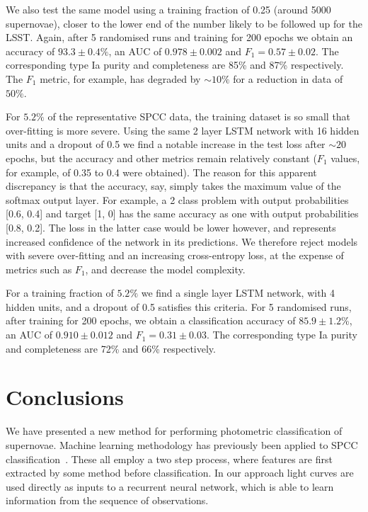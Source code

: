 \documentclass[nofootinbib,amsmath,amssymb,10pt,eqsecnum, twocolumn]{revtex4-1}
\begin{document}
We also test the same model using a training fraction of 0.25 (around 5000 supernovae), closer to the lower  end of the number likely to be followed up for the LSST. Again, after 5 randomised runs and training for 200 epochs we obtain an accuracy of $93.3 \pm 0.4\%$, an AUC of $0.978 \pm 0.002$ and $F_1 = 0.57 \pm 0.02$. The corresponding type Ia purity and completeness are 85\% and 87\% respectively. The $F_1$ metric, for example, has degraded by $\sim10\%$ for a reduction in data of $50\%$.

For $5.2\%$ of the representative SPCC data, the training dataset is so small that over-fitting is more severe. Using the same 2 layer LSTM network with 16 hidden units and a dropout of 0.5 we find a notable increase in the test loss after $\sim 20$ epochs, but the accuracy and other metrics remain relatively constant ($F_1$ values, for example, of 0.35 to 0.4 were obtained). The reason for this apparent discrepancy is that the accuracy, say, simply takes the maximum value of the softmax output layer. For example, a 2 class problem with output probabilities [0.6, 0.4] and target [1, 0] has the same accuracy as one with output probabilities [0.8, 0.2]. The loss in the latter case would be lower however, and represents increased confidence of the network in its predictions. We therefore reject models with severe over-fitting and an increasing cross-entropy loss, at the expense of metrics such as $F_1$, and decrease the model complexity. 

For a training fraction of  $5.2\%$ we find a single layer LSTM network, with 4 hidden units, and a dropout of 0.5 satisfies this criteria. For 5 randomised runs, after training for  200 epochs, we obtain a classification accuracy of $85.9 \pm 1.2$\%, an AUC of $0.910 \pm 0.012$ and $F_1 = 0.31 \pm 0.03$. The corresponding type Ia purity and completeness are 72\% and 66\% respectively.

\section{Conclusions}

We have presented a new method for performing  photometric classification of supernovae. Machine learning methodology has previously been applied to SPCC classification~\cite{Newling:2010bp, Karpenka:2012pm, Lochner:2016hbn}. These all employ a two step process, where features are first extracted by some method before classification. In our approach light curves are used directly as inputs to a recurrent neural network, which is able to learn information from the sequence of observations.
\end{document}
